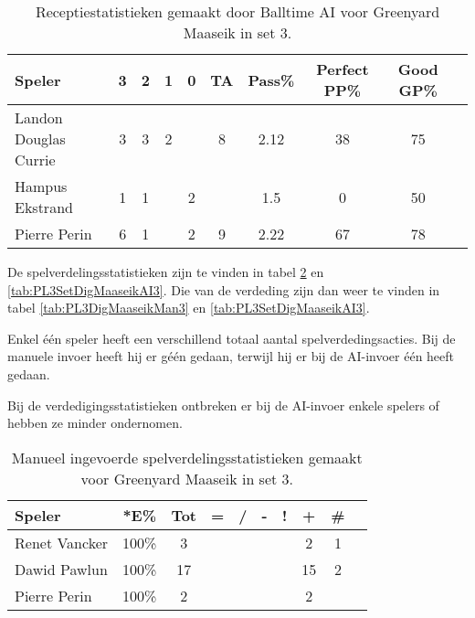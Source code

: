 \begin{table}[ht!]
  \centering
  \scriptsize
  \begin{tabular}{|l|c|c|c|c|c|c|c|c|c|} \hline
    \textbf{Speler} & 3 & 2 & 1 & 0 & TA & Pass\% & Perfect PP\% & Good GP\% \\ \hline
    Landon Douglas Currie & 3 & 3 & 2 &  & 8 & 2.12 & 38 & 75 \\
    Hampus Ekstrand & 1 & 1 &   & 2 & & 1.5 & 0 & 50 \\
    Pierre Perin & 6 & 1 &   & 2 & 9 & 2.22 & 67 & 78 \\ \hline
  \end{tabular}
  \caption[Receptiestatistieken gemaakt door Balltime AI voor Greenyard Maaseik in set 3]{\label{tab:PL3ReceiveMaaseikAI3}Receptiestatistieken gemaakt door Balltime AI voor Greenyard Maaseik in set 3.}
\end{table}

De spelverdelingsstatistieken zijn te vinden in tabel \ref{tab:PL3SetMaaseikMan3} en \ref{tab:PL3SetDigMaaseikAI3}. Die van de verdeding zijn dan weer te vinden in tabel \ref{tab:PL3DigMaaseikMan3} en \ref{tab:PL3SetDigMaaseikAI3}. 

Enkel één speler heeft een verschillend totaal aantal spelverdedingsacties. Bij de manuele invoer heeft hij er géén gedaan, terwijl hij er bij de AI-invoer één heeft gedaan. 

Bij de verdedigingsstatistieken ontbreken er bij de AI-invoer enkele spelers of hebben ze minder ondernomen. 

\begin{table}[ht!]
    \centering
    \scriptsize
    \begin{tabular}{|l|c|c|c|c|c|c|c|c|c|} \hline
        \textbf{Speler} & *E\% & Tot & = & / & - & ! & + & \#\\ \hline
        Renet Vancker & 100\% & 3 &  &  &  &  & 2 & 1 \\ 
        Dawid Pawlun & 100\% & 17 &  &  &  &  & 15 & 2 \\ 
        Pierre Perin & 100\% & 2 &  &  &  &  & 2 &  \\ \hline
    \end{tabular}
    \caption[Manueel ingevoerde spelverdelingsstatistieken gemaakt voor Greenyard Maaseik in set 3]{\label{tab:PL3SetMaaseikMan3}Manueel ingevoerde spelverdelingsstatistieken gemaakt voor Greenyard Maaseik in set 3.}
\end{table}

